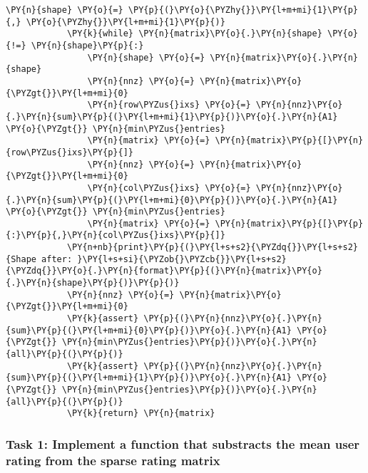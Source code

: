 \begin{Verbatim}[commandchars=\\\{\}]
            \PY{n}{shape} \PY{o}{=} \PY{p}{(}\PY{o}{\PYZhy{}}\PY{l+m+mi}{1}\PY{p}{,} \PY{o}{\PYZhy{}}\PY{l+m+mi}{1}\PY{p}{)}
            \PY{k}{while} \PY{n}{matrix}\PY{o}{.}\PY{n}{shape} \PY{o}{!=} \PY{n}{shape}\PY{p}{:}
                \PY{n}{shape} \PY{o}{=} \PY{n}{matrix}\PY{o}{.}\PY{n}{shape}
                \PY{n}{nnz} \PY{o}{=} \PY{n}{matrix}\PY{o}{\PYZgt{}}\PY{l+m+mi}{0}
                \PY{n}{row\PYZus{}ixs} \PY{o}{=} \PY{n}{nnz}\PY{o}{.}\PY{n}{sum}\PY{p}{(}\PY{l+m+mi}{1}\PY{p}{)}\PY{o}{.}\PY{n}{A1} \PY{o}{\PYZgt{}} \PY{n}{min\PYZus{}entries}
                \PY{n}{matrix} \PY{o}{=} \PY{n}{matrix}\PY{p}{[}\PY{n}{row\PYZus{}ixs}\PY{p}{]}
                \PY{n}{nnz} \PY{o}{=} \PY{n}{matrix}\PY{o}{\PYZgt{}}\PY{l+m+mi}{0}
                \PY{n}{col\PYZus{}ixs} \PY{o}{=} \PY{n}{nnz}\PY{o}{.}\PY{n}{sum}\PY{p}{(}\PY{l+m+mi}{0}\PY{p}{)}\PY{o}{.}\PY{n}{A1} \PY{o}{\PYZgt{}} \PY{n}{min\PYZus{}entries}
                \PY{n}{matrix} \PY{o}{=} \PY{n}{matrix}\PY{p}{[}\PY{p}{:}\PY{p}{,}\PY{n}{col\PYZus{}ixs}\PY{p}{]}
            \PY{n+nb}{print}\PY{p}{(}\PY{l+s+s2}{\PYZdq{}}\PY{l+s+s2}{Shape after: }\PY{l+s+si}{\PYZob{}\PYZcb{}}\PY{l+s+s2}{\PYZdq{}}\PY{o}{.}\PY{n}{format}\PY{p}{(}\PY{n}{matrix}\PY{o}{.}\PY{n}{shape}\PY{p}{)}\PY{p}{)}
            \PY{n}{nnz} \PY{o}{=} \PY{n}{matrix}\PY{o}{\PYZgt{}}\PY{l+m+mi}{0}
            \PY{k}{assert} \PY{p}{(}\PY{n}{nnz}\PY{o}{.}\PY{n}{sum}\PY{p}{(}\PY{l+m+mi}{0}\PY{p}{)}\PY{o}{.}\PY{n}{A1} \PY{o}{\PYZgt{}} \PY{n}{min\PYZus{}entries}\PY{p}{)}\PY{o}{.}\PY{n}{all}\PY{p}{(}\PY{p}{)}
            \PY{k}{assert} \PY{p}{(}\PY{n}{nnz}\PY{o}{.}\PY{n}{sum}\PY{p}{(}\PY{l+m+mi}{1}\PY{p}{)}\PY{o}{.}\PY{n}{A1} \PY{o}{\PYZgt{}} \PY{n}{min\PYZus{}entries}\PY{p}{)}\PY{o}{.}\PY{n}{all}\PY{p}{(}\PY{p}{)}
            \PY{k}{return} \PY{n}{matrix}
\end{Verbatim}

    \hypertarget{task-1-implement-a-function-that-substracts-the-mean-user-rating-from-the-sparse-rating-matrix}{%
\subsubsection{Task 1: Implement a function that substracts the mean
user rating from the sparse rating
matrix}\label{task-1-implement-a-function-that-substracts-the-mean-user-rating-from-the-sparse-rating-matrix}}

